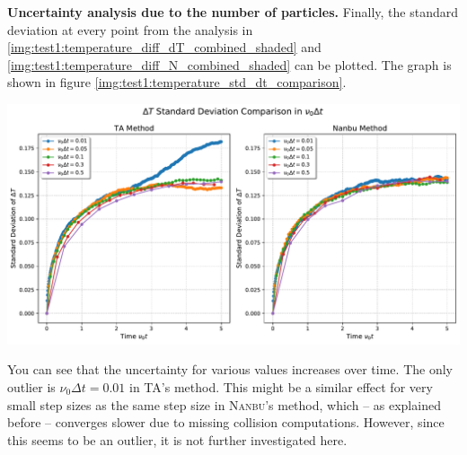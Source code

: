 \textbf{Uncertainty analysis due to the number of particles.} Finally, the standard deviation at every point from the analysis in \ref{img:test1:temperature_diff_dT_combined_shaded} and \ref{img:test1:temperature_diff_N_combined_shaded} can be plotted. The graph is shown in figure \ref{img:test1:temperature_std_dt_comparison}. \\
\begin{minipage}[h]{\linewidth}
    \vspace{5pt}
    \centering
    \includegraphics[width=\linewidth]{ressources/test1/temperature_std_dt_comparison.pdf}
    \label{img:test1:temperature_std_dt_comparison}
    \vspace{5pt}
\end{minipage}
You can see that the uncertainty for various values increases over time. The only outlier is $\nu_0 \Delta t = 0.01$ in TA's method. This might be a similar effect for very small step sizes as the same step size in \textsc{Nanbu}'s method, which -- as explained before -- converges slower due to missing collision computations. However, since this seems to be an outlier, it is not further investigated here.

